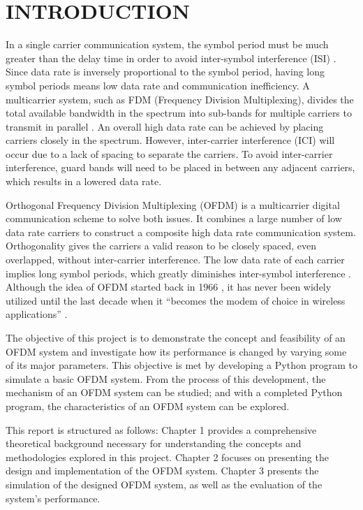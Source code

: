 \section*{INTRODUCTION}

In a single carrier communication system, the symbol period must be much greater than the delay time in order to avoid inter-symbol interference (ISI) \cite{b1}. Since data rate is inversely proportional to the symbol period, having long symbol periods means low data rate and communication inefficiency. A multicarrier system, such as FDM (Frequency Division Multiplexing), divides the total available bandwidth in the spectrum into sub-bands for multiple carriers to transmit in parallel \cite{b2}. An overall high data rate can be achieved by placing carriers closely in the spectrum. However, inter-carrier interference (ICI) will occur due to a lack of spacing to separate the carriers. To avoid inter-carrier interference, guard bands will need to be placed in between any adjacent carriers, which results in a lowered data rate.

Orthogonal Frequency Division Multiplexing (OFDM) is a multicarrier digital communication scheme to solve both issues. It combines a large number of low data rate carriers to construct a composite high data rate communication system. Orthogonality gives the carriers a valid reason to be closely spaced, even overlapped, without inter-carrier interference. The low data rate of each carrier implies long symbol periods, which greatly diminishes inter-symbol interference \cite{b3}. Although the idea of OFDM started back in 1966 \cite{b4}, it has never been widely utilized until the last decade when it “becomes the modem of choice in wireless applications” \cite{b5}.

The objective of this project is to demonstrate the concept and feasibility of an OFDM system and investigate how its performance is changed by varying some of its major parameters. This objective is met by developing a Python program to simulate a basic OFDM system. From the process of this development, the mechanism of an OFDM system can be studied; and with a completed Python program, the characteristics of an OFDM system can be explored.

This report is structured as follows: Chapter 1 provides a comprehensive theoretical background necessary for understanding the concepts and methodologies explored in this project. Chapter 2 focuses on presenting the design and implementation of the OFDM system. Chapter 3 presents the simulation of the designed OFDM system, as well as the evaluation of the system's performance.

\newpage